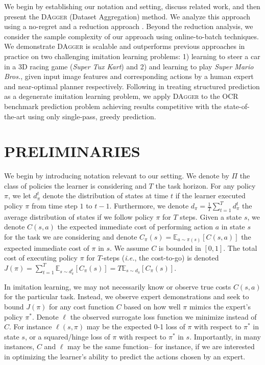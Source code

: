 \documentclass[twoside]{article}
\begin{document}
We begin by establishing our notation and setting, discuss related work, and then present the \textsc{DAgger} (Dataset Aggregation) method. We analyze this approach using a no-regret and a reduction approach \citep{Beygelzimer05}. Beyond the reduction analysis, we consider the sample complexity of our approach using online-to-batch \citep{CesaBianchi04} techniques. We demonstrate \textsc{DAgger} is scalable and outperforms previous approaches in practice on two challenging imitation learning problems: 1) learning to steer a car in a 3D racing game (\emph{Super Tux Kart}) and 2) and learning to play \emph{Super Mario Bros.}, given input image features and corresponding actions by a human expert and near-optimal planner respectively. Following \citet{Daume09} in treating structured prediction as a degenerate imitation learning problem, we apply \textsc{DAgger} to the OCR \citep{Taskar03} benchmark prediction problem achieving results competitive with the state-of-the-art \citep{Taskar03, Ratliff07, Daume09} using only single-pass, greedy prediction.
%
\section{PRELIMINARIES}
%
We begin by introducing notation relevant to our setting. We denote by $\Pi$ the class of policies the learner is considering and $T$ the task horizon. For any policy $\pi$, we let $d^t_\pi$ denote the distribution of states at time $t$ if the learner executed policy $\pi$ from time step $1$ to $t-1$. Furthermore, we denote $d_\pi = \frac{1}{T} \sum_{t=1}^T d^t_\pi$ the average distribution of states if we follow policy $\pi$ for $T$ steps. Given a state $s$, we denote $C(s,a)$ the expected immediate cost of performing action $a$ in state $s$ for the task we are considering and denote $C_\pi(s) = \mathbb{E}_{a \sim \pi(s)}[C(s,a)]$ the expected immediate cost of $\pi$ in $s$. We assume $C$ is bounded in $[0,1]$. The total cost of executing policy $\pi$ for $T$-steps (\emph{i.e.}, the cost-to-go) is denoted $J(\pi) = \sum_{t=1}^T \mathbb{E}_{s \sim d^t_\pi}[C_\pi(s)] = T \mathbb{E}_{s \sim d_\pi}[C_\pi(s)]$.

In imitation learning, we may not necessarily know or observe true costs $C(s,a)$ for the particular task. Instead, we observe expert demonstrations and seek to bound $J(\pi)$ for any cost function $C$ based on how well $\pi$ mimics the expert's policy $\pi^*$. Denote $\ell$ the observed surrogate loss function we minimize instead of $C$. For instance $\ell(s,\pi)$ may be the expected 0-1 loss of $\pi$ with respect to $\pi^*$ in state $s$, or a squared/hinge loss of $\pi$ with respect to $\pi^*$ in $s$. Importantly, in many instances, $C$ and $\ell$ may be the same function-- for instance, if we are interested in optimizing the learner's ability to predict the actions chosen by an expert.
\end{document}
